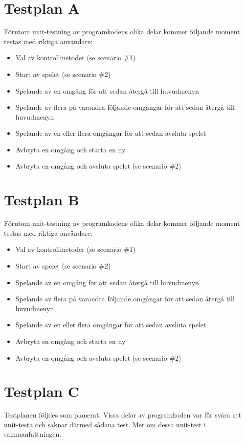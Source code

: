 \documentclass[a4paper,11pt]{article}
\begin{document}
\section{Testplan A}
Förutom unit-testning av programkodens olika delar kommer följande moment testas med riktiga användare:

\begin{itemize}
\item Val av kontrollmetoder (se scenario \#1)
\item Start av spelet (se scenario \#2)
\item Spelande av en omgång för att sedan återgå till huvudmenyn
\item Spelande av flera på varandra följande omgångar för att sedan återgå till huvudmenyn
\item Spelande av en eller flera omgångar för att sedan avsluta spelet
\item Avbryta en omgång och starta en ny
\item Avbryta en omgång och avsluta spelet (se scenario \#2)
\end{itemize}

\section{Testplan B}
Förutom unit-testning av programkodens olika delar kommer följande moment testas med riktiga användare:

\begin{itemize}
\item Val av kontrollmetoder (se scenario \#1)
\item Start av spelet (se scenario \#2)
\item Spelande av en omgång för att sedan återgå till huvudmenyn
\item Spelande av flera på varandra följande omgångar för att sedan återgå till huvudmenyn
\item Spelande av en eller flera omgångar för att sedan avsluta spelet
\item Avbryta en omgång och starta en ny
\item Avbryta en omgång och avsluta spelet (se scenario \#2)
\end{itemize}

\section{Testplan C}
Testplanen följdes som planerat. Vissa delar av programkoden var för svåra att unit-testa och saknar
därmed sådana test. Mer om dessa unit-test i sammanfattningen.
\end{document}

